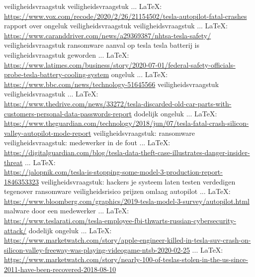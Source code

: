 \begin{thebibliography}{99}
veiligheidsvraagstuk
veiligheidsvraagstuk
 ... \LaTeX:\\ \url{https://www.vox.com/recode/2020/2/26/21154502/tesla-autopilot-fatal-crashes}
rapport over ongeluk
veiligheidsvraagstuk
veiligheidsvraagstuk
 ... \LaTeX:\\ \url{https://www.caranddriver.com/news/a29369387/nhtsa-tesla-safety/}
veiligheidsvraagstuk
ransomware aanval op tesla
tesla batterij is veiligheidsvraagstuk geworden
 ... \LaTeX:\\ \url{https://www.latimes.com/business/story/2020-07-01/federal-safety-officials-probe-tesla-battery-cooling-system}
ongeluk
 ... \LaTeX:\\ \url{https://www.bbc.com/news/technology-51645566}
veiligheidsvraagstuk
veiligheidsvraagstuk
 ... \LaTeX:\\ \url{https://www.thedrive.com/news/33272/tesla-discarded-old-car-parts-with-customers-personal-data-passwords-report}
dodelijk ongeluk
 ... \LaTeX:\\ \url{https://www.theguardian.com/technology/2018/jun/07/tesla-fatal-crash-silicon-valley-autopilot-mode-report}
veiligheidsvraagstuk: ransomware
veiligheidsvraagstuk: medewerker in de fout
 ... \LaTeX:\\ \url{https://digitalguardian.com/blog/tesla-data-theft-case-illustrates-danger-insider-threat}
 ... \LaTeX:\\ \url{https://jalopnik.com/tesla-is-stopping-some-model-3-production-report-1846353323}
veiligheidsvraagstuk: hackers je systeem laten testen
verdedigen tegenover ransomware
veiligheidsrisico
prijzen omlaag
autopilot
 ... \LaTeX:\\ \url{https://www.bloomberg.com/graphics/2019-tesla-model-3-survey/autopilot.html}
malware door een medewerker
 ... \LaTeX:\\ \url{https://www.teslarati.com/tesla-employee-fbi-thwarts-russian-cybersecurity-attack/}
dodelijk ongeluk
 ... \LaTeX:\\ \url{https://www.marketwatch.com/story/apple-engineer-killed-in-tesla-suv-crash-on-silicon-valley-freeway-was-playing-videogame-ntsb-2020-02-25}
 ... \LaTeX:\\ \url{https://www.marketwatch.com/story/nearly-100-of-teslas-stolen-in-the-us-since-2011-have-been-recovered-2018-08-10}

\end{thebibliography}
